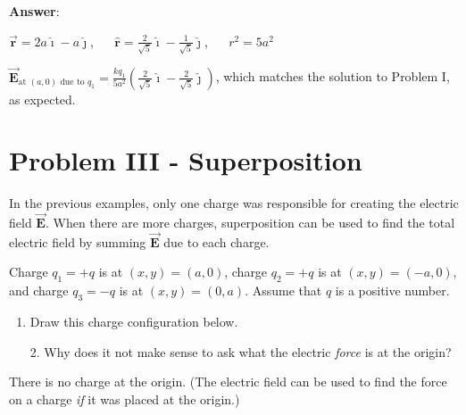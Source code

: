\documentclass{article}
\newcommand{\ds}[0]{\displaystyle}
\newcommand{\ihat}[0]{\hat{\boldsymbol{\imath}}}
\newcommand{\jhat}[0]{\hat{\boldsymbol{\jmath}}}
\newcommand{\rhat}[0]{\hat{\mathbf{r}}}
\newcommand{\bfvec}[1]{\vec{\mathbf{#1}}}
\begin{document}


\ifsolutions
{\bf Answer}:

$\bfvec{r}=2a\ihat-a\jhat$,
$\quad$
$\ds\rhat=\frac{2}{\sqrt{5}}\ihat-\frac{1}{\sqrt{5}}\jhat$,
$\quad$ $r^2=5a^2$

$\ds\bfvec{E}_{\text{at }(a,0) \text{ due to }q_1}=\frac{kq_1}{5a^2}\left(\frac{2}{\sqrt{5}}\ihat -\frac{2}{\sqrt{5}}\jhat\right)$, which matches the solution to Problem I, as expected.
\fi

\newpage

\section{Problem III - Superposition}

In the previous examples, only one charge was responsible for creating the electric field $\bfvec{E}$. When there are more charges, superposition can be used to find the total electric field by summing $\bfvec{E}$ due to each charge.

Charge $q_1 = +q$ is at $(x, y) = (a, 0)$, charge $q_2 = +q$ is at $(x, y) = (-a, 0)$, and charge $q_3 = -q$ is at $(x, y) = (0, a)$. Assume that $q$ is a positive number.

\begin{enumerate}

  \item Draw this charge configuration below.

\end{enumerate}

\ifsolutions


\else


\fi
\ifsolutions\else

\fi

\begin{enumerate}

  \item[2.] Why does it not make sense to ask what the electric \emph{force} is at the origin?

\end{enumerate}

\ifsolutions
There is no charge at the origin. (The electric field can be used to find the force on a charge \emph{if} it was placed at the origin.)
\else

\vskip 24pt
\fi
\ifsolutions\else
\vskip 24pt
\fi
\end{document}
